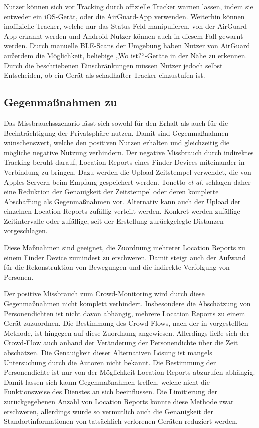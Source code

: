 Nutzer können sich vor Tracking durch offizielle Tracker warnen lassen, indem sie entweder ein iOS-Gerät, oder die AirGuard-App verwenden.
Weiterhin können inoffizielle Tracker, welche nur das Status-Feld manipulieren, von der AirGuard-App erkannt werden und Android-Nutzer können auch in diesem Fall gewarnt werden.
Durch manuelle \ac{BLE}-Scans der Umgebung haben Nutzer von AirGuard außerdem die Möglichkeit, beliebige „Wo ist?“-Geräte in der Nähe zu erkennen.
Durch die beschriebenen Einschränkungen müssen Nutzer jedoch selbst Entscheiden, ob ein Gerät als schadhafter Tracker einzustufen ist.

\subsection{Gegenmaßnahmen zu }

Das Missbrauchsszenario  lässt sich sowohl für den Erhalt als auch für die Beeinträchtigung der Privatsphäre nutzen.
Damit sind Gegenmaßnahmen wünschenswert, welche den positiven Nutzen erhalten und gleichzeitig die mögliche negative Nutzung verhindern.
Der negative Missbrauch durch indirektes Tracking beruht darauf, Location Reports eines Finder Devices miteinander in Verbindung zu bringen.
Dazu werden die Upload-Zeitstempel verwendet, die von Apples Servern beim Empfang gespeichert werden.
Tonetto \textit{et al.} \cite{Tonetto_FindMy} schlagen daher eine Reduktion der Genauigkeit der Zeitstempel oder deren komplette Abschaffung als Gegenmaßnahmen vor.
Alternativ kann auch der Upload der einzelnen Location Reports zufällig verteilt werden.
Konkret werden zufällige Zeitintervalle oder zufällige, seit der Erstellung zurückgelegte Distanzen vorgeschlagen.

Diese Maßnahmen sind geeignet, die Zuordnung mehrerer Location Reports zu einem Finder Device zumindest zu erschweren.
Damit steigt auch der Aufwand für die Rekonstruktion von Bewegungen und die indirekte Verfolgung von Personen.

Der positive Missbrauch zum Crowd-Monitoring wird durch diese Gegenmaßnahmen nicht komplett verhindert.
Insbesondere die Abschätzung von Personendichten ist nicht davon abhängig, mehrere Location Reports zu einem Gerät zuzuordnen.
Die Bestimmung des Crowd-Flows, nach der in \cite{Tonetto_FindMy} vorgestellten Methode, ist hingegen auf diese Zuordnung angewiesen.
Allerdings ließe sich der Crowd-Flow auch anhand der Veränderung der Personendichte über die Zeit abschätzen.
Die Genauigkeit dieser Alternativen Lösung ist mangels Untersuchung durch die Autoren nicht bekannt.
Die Bestimmung der Personendichte ist nur von der Möglichkeit Location Reports abzurufen abhängig.
Damit lassen sich kaum Gegenmaßnahmen treffen, welche nicht die Funktionsweise des Dienstes an sich beeinflussen.
Die Limitierung der zurückgegebenen Anzahl von Location Reports könnte diese Methode zwar erschweren, allerdings würde so vermutlich auch die Genauigkeit der Standortinformationen von tatsächlich verlorenen Geräten reduziert werden.

